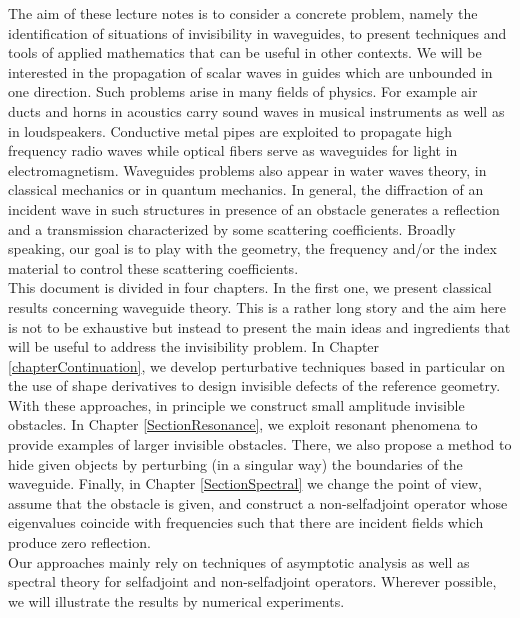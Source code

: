 \documentclass[11pt,a4paper]{report}
\begin{document}
\noindent The aim of these lecture notes is to consider a concrete problem, namely the identification of situations of invisibility in waveguides, to present techniques and tools of applied mathematics that can be useful in other contexts. We will be interested in the propagation of scalar waves in guides which are unbounded in one direction. Such problems arise in many fields of physics. For example air ducts and horns in acoustics carry sound waves in musical instruments as well as in loudspeakers.  Conductive metal pipes are exploited to propagate
high frequency radio waves while optical fibers serve as waveguides for light in electromagnetism. Waveguides problems also appear in water waves theory, in classical mechanics or in quantum mechanics. In general, the diffraction of an incident wave in such  structures in presence of an obstacle generates a reflection and a transmission characterized by some scattering coefficients. Broadly speaking, our goal is to play with the geometry, the frequency and/or the index material to control these scattering coefficients.\\
\newline
This document is divided in four chapters. In the first one, we present classical results concerning waveguide theory. This is a rather long story and the aim here is not to be exhaustive but instead to present the main ideas and ingredients that will be useful to address the invisibility problem. In Chapter \ref{chapterContinuation}, we develop perturbative techniques based in particular on the use of shape derivatives to design invisible defects of the reference geometry. With these approaches, in principle we construct small amplitude invisible obstacles. In Chapter \ref{SectionResonance}, we exploit resonant phenomena to provide examples of larger invisible obstacles. There, we also propose a method to hide given objects by perturbing (in a singular way) the boundaries of the waveguide. Finally, in Chapter \ref{SectionSpectral} we change the point of view, assume that the obstacle is given, and construct a non-selfadjoint operator whose eigenvalues coincide with frequencies such that there are incident fields which produce zero reflection.\\
\newline 
Our approaches mainly rely on techniques of asymptotic analysis as well as spectral theory for selfadjoint and non-selfadjoint operators. Wherever possible, we will illustrate the results by numerical experiments.\\
\newline
\end{document}
